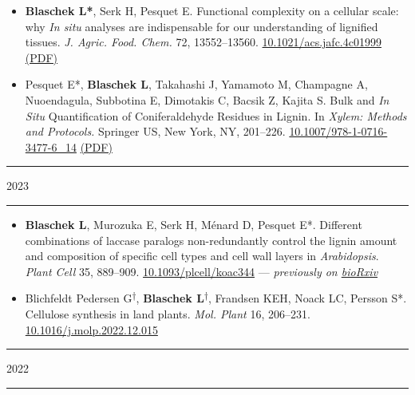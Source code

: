 \documentclass[11pt]{article}
\newcommand*{\xdash}[1][3em]{\rule[0.5ex]{#1}{0.55pt}}
\begin{document}
\vspace{-0.175cm}	
\begin{itemize}[label={},itemindent=-9pt,leftmargin=24pt]
	\itemsep-0.1cm
	\item \textbf{Blaschek L*}, Serk H, Pesquet E. Functional complexity on a cellular scale: why \textit{In situ} analyses are indispensable for our understanding of lignified tissues. \textit{J. Agric. Food. Chem.} 72, 13552--13560. \href{https://doi.org/10.1021/acs.jafc.4c01999}{10.1021/acs.jafc.4c01999} \href{https://leonardblaschek.github.io/assets/pdf/10_1021_acs_jafc_4c01999.pdf}{(PDF)}
	\item Pesquet E*, \textbf{Blaschek L}, Takahashi J,	Yamamoto M, Champagne A, Nuoendagula, Subbotina E, Dimotakis C, Bacsik Z, Kajita S. Bulk and \textit{In Situ} Quantification of Coniferaldehyde Residues in Lignin. In \textit{Xylem: Methods and Protocols.} Springer US, New York, NY, 201–226. \href{https://doi.org/10.1007/978-1-0716-3477-6_14}{10.1007/978-1-0716-3477-6\_14} \href{https://leonardblaschek.github.io/assets/pdf/10_1007_978-1-0716-3477-6_14.pdf}{(PDF)}
\end{itemize}

\hspace*{\fill} \xdash[6em] \large{\textsc{2023}} \xdash[6em] \hspace*{\fill} \normalsize

\vspace{-0.175cm}	
\begin{itemize}[label={},itemindent=-9pt,leftmargin=24pt]
	\itemsep-0.1cm
	\item \textbf{Blaschek L}, Murozuka E, Serk H, Ménard D, Pesquet E*. Different combinations of laccase paralogs non-redundantly control the lignin amount and composition of specific cell types and cell wall layers in \textit{Arabidopsis}. \textit{Plant Cell} 35, 889–909. \href{https://doi.org/10.1093/plcell/koac344}{10.1093/plcell/koac344} — \textit{previously on \href{https://doi.org/10.1101/2022.05.04.490011}{bioRxiv}}
	\item Blichfeldt Pedersen G\textsuperscript{$\dagger$}, \textbf{Blaschek L}\textsuperscript{$\dagger$}, Frandsen KEH, Noack LC, Persson S*. Cellulose synthesis in land plants. \textit{Mol. Plant} 16, 206–231. \href{https://doi.org/10.1016/j.molp.2022.12.015}{10.1016/j.molp.2022.12.015}
\end{itemize}

\hspace*{\fill} \xdash[6em] \large{\textsc{2022}} \xdash[6em] \hspace*{\fill} \normalsize
\end{document}
